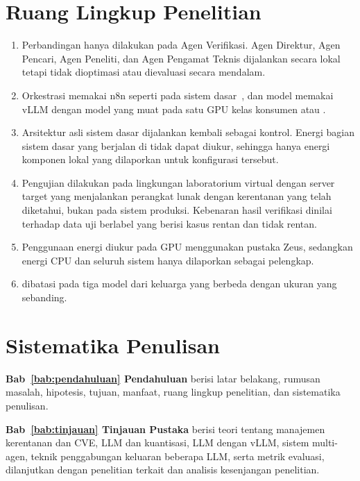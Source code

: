 \section{Ruang Lingkup Penelitian}
\label{sec:ruang-lingkup}
\begin{enumerate}
  \item Perbandingan hanya dilakukan pada Agen Verifikasi. Agen Direktur, Agen
        Pencari, Agen Peneliti, dan Agen Pengamat Teknis dijalankan secara lokal
        tetapi tidak dioptimasi atau dievaluasi secara mendalam.
  \item Orkestrasi memakai n8n seperti pada sistem dasar~\cite{wijaya2026}, dan
         model memakai vLLM dengan model  yang
        muat pada satu GPU kelas konsumen atau .
  \item Arsitektur asli sistem dasar dijalankan kembali sebagai kontrol. Energi
        bagian sistem dasar yang berjalan di  tidak dapat diukur,
        sehingga hanya energi komponen lokal yang dilaporkan untuk konfigurasi
        tersebut.
  \item Pengujian dilakukan pada lingkungan laboratorium virtual dengan server
        target yang menjalankan perangkat lunak dengan kerentanan yang telah
        diketahui, bukan pada sistem produksi. Kebenaran hasil verifikasi dinilai
        terhadap data uji berlabel yang berisi kasus rentan dan tidak rentan.
  \item Penggunaan energi diukur pada GPU menggunakan pustaka Zeus, sedangkan
        energi CPU dan seluruh sistem hanya dilaporkan sebagai pelengkap.
  \item {} dibatasi pada tiga model dari keluarga yang berbeda
        dengan ukuran yang sebanding.
\end{enumerate}

\section{Sistematika Penulisan}
\label{sec:sistematika}
\textbf{Bab~\ref{bab:pendahuluan} Pendahuluan} berisi latar belakang, rumusan
masalah, hipotesis, tujuan, manfaat, ruang lingkup penelitian, dan sistematika
penulisan.

\textbf{Bab~\ref{bab:tinjauan} Tinjauan Pustaka} berisi teori tentang manajemen
kerentanan dan CVE, LLM dan kuantisasi,  LLM dengan vLLM, sistem
multi-agen, teknik penggabungan keluaran beberapa LLM, serta metrik evaluasi,
dilanjutkan dengan penelitian terkait dan analisis kesenjangan penelitian.

